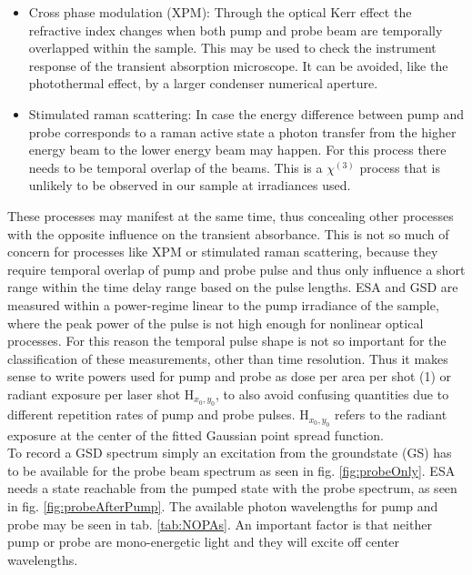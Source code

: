 \documentclass[twoside,openright,listof=numbered]{scrreprt}
\begin{document}
\begin{itemize}
\item Cross phase modulation (XPM): Through the optical Kerr effect the refractive index changes when both pump and probe beam are temporally overlapped within the sample. This may be used to check the instrument response of the transient absorption microscope. It can be avoided, like the photothermal effect, by a larger condenser numerical aperture.
\item Stimulated raman scattering: In case the energy difference between pump and probe corresponds to a raman active state a photon transfer from the higher energy beam to the lower energy beam may happen. For this process there needs to be temporal overlap of the beams. This is a $\chi^{\left(3\right)}$ process that is unlikely to be observed in our sample at irradiances used.\cite{Prince2017}
\end{itemize}

These processes may manifest at the same time, thus concealing other processes with the opposite influence on the transient absorbance. This is not so much of concern for processes like XPM or stimulated raman scattering, because they require temporal overlap of pump and probe pulse and thus only influence a short range within the time delay range based on the pulse lengths. ESA and GSD are measured within a power-regime linear to the pump irradiance of the sample, where the peak power of the pulse is not high enough for nonlinear optical processes. For this reason the temporal pulse shape is not so important for the classification of these measurements, other than time resolution. Thus it makes sense to write powers used for pump and probe as dose per area per shot (\SI{1}{\radExp}) or radiant exposure per laser shot $\mathrm{H}_{x_0,y_0}$, to also avoid confusing quantities due to different repetition rates of pump and probe pulses. $\mathrm{H}_{x_0,y_0}$ refers to the radiant exposure at the center of the fitted Gaussian point spread function.\\

To record a GSD spectrum simply an excitation from the groundstate (GS) has to be available for the probe beam spectrum as seen in fig. \ref{fig:probeOnly}. ESA needs a state reachable from the pumped state with the probe spectrum, as seen in fig. \ref{fig:probeAfterPump}. The available photon wavelengths for pump and probe may be seen in tab. \ref{tab:NOPAs}. An important factor is that neither pump or probe are mono-energetic light and they will excite off center wavelengths.
\end{document}
